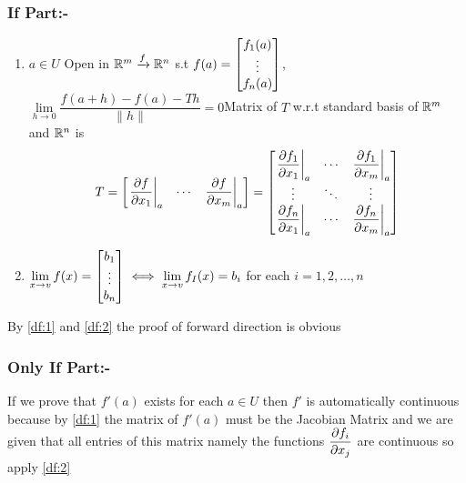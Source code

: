 \begin{myproof}
	\subsubsection{If Part:-}
	\begin{enumerate}[label=\bfseries\tiny\protect\circled{\small\arabic*}]
		\item \label{df:1} $a\in U$ Open in $\mathbb{R}^m\xrightarrow{f}\mathbb{R}^n$ s.t $f(a)=\left[ \begin{matrix}
					      f_1(a) \\ \vdots\\ f_n(a)
				      \end{matrix} \right]$, $\lim\limits_{h\to 0}\dfrac{f(a+h)-f(a)-Th}{\|h\|}=0$Matrix of $T$ w.r.t standard basis of $\mathbb{R}^m$ and $\mathbb{R}^n$ is \[T=  \left[ \begin{matrix}
					      \left.\dfrac{\partial f}{\partial x_1}\right|_a & \cdots & \left.\dfrac{\partial f}{\partial x_m}\right|_a
				      \end{matrix} \right]=\left[ \begin{matrix}
					      \left.\dfrac{\partial f_1}{\partial x_1}\right|_a & \cdots & \left.\dfrac{\partial f_1}{\partial x_m}\right|_a \\
					      \vdots                    & \ddots & \vdots                    \\
					      \left.\dfrac{\partial f_n}{\partial x_1}\right|_a & \cdots & \left.\dfrac{\partial f_n}{\partial x_m}\right|_a
				      \end{matrix} \right]\]
		\item \label{df:2}$\lim\limits_{x\to v}f(x)=\left[ \begin{matrix}
					      b_1 \\ \vdots\\ b_n
				      \end{matrix} \right]\iff \lim\limits_{x\to v}f_I(x)=b_i$ for each $i=1,2,\dots,n$
	\end{enumerate}
	By \ref{df:1} and \ref{df:2}  the proof of forward direction is obvious
	\subsubsection{Only If Part:-}
	If we prove that $f'(a)$ exists for each $a\in U$ then $f'$ is automatically continuous because by \ref{df:1} the matrix of $f'(a)$ must be the Jacobian Matrix and we are given that all entries of this matrix namely the functions $\dfrac{\partial f_i}{\partial x_j}$ are continuous so apply \ref{df:2}


\end{myproof}

